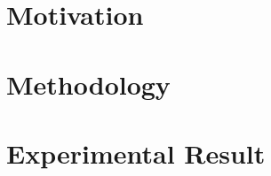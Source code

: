 \begin{comment}



\end{comment}

\section{Motivation}

\section{Methodology}

\section{Experimental Result}

